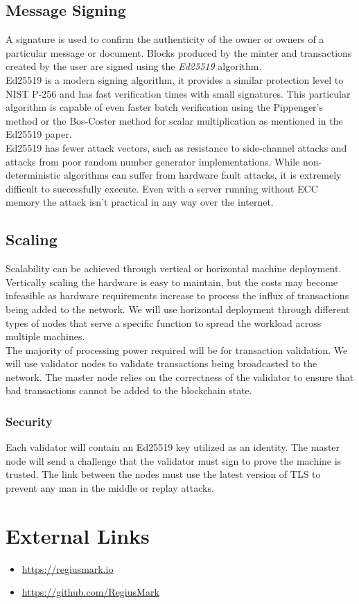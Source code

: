 \documentclass[12pt,a4paper]{article}
\begin{document}
  \subsection{Message Signing}
  A signature is used to confirm the authenticity of the owner or owners of a
  particular message or document. Blocks produced by the minter and transactions
  created by the user are signed using the \textit{Ed25519}\cite{ed25519}
  algorithm.\\

  Ed25519 is a modern signing algorithm, it provides a similar protection level
  to NIST P-256 and has fast verification times with small signatures. This
  particular algorithm is capable of even faster batch verification using the
  Pippenger's method or the Bos-Coster method for scalar multiplication as
  mentioned in the Ed25519 paper.\\

  Ed25519 has fewer attack vectors, such as resistance to side-channel attacks
  and attacks from poor random number generator implementations. While
  non-deterministic algorithms can suffer from hardware fault attacks, it is
  extremely difficult to successfully execute. Even with a server running
  without ECC memory the attack isn't practical in any way over the
  internet.

  \subsection{Scaling}
  Scalability can be achieved through vertical or horizontal machine deployment.
  Vertically scaling the hardware is easy to maintain, but the costs may become
  infeasible as hardware requirements increase to process the influx of
  transactions being added to the network. We will use horizontal deployment
  through different types of nodes that serve a specific function to spread the
  workload across multiple machines.\\

  The majority of processing power required will be for transaction validation.
  We will use validator nodes to validate transactions being broadcasted to the
  network. The master node relies on the correctness of the validator to ensure
  that bad transactions cannot be added to the blockchain state.\\

  \subsubsection{Security}
  Each validator will contain an Ed25519 key utilized as an identity. The master
  node will send a challenge that the validator must sign to prove the machine
  is trusted. The link between the nodes must use the latest version of TLS to
  prevent any man in the middle or replay attacks.

  \newpage
  \section*{External Links}
  \begin{itemize}
    \item{\url{https://regiusmark.io}}
    \item{\url{https://github.com/RegiusMark}}
  \end{itemize}
  \printbibliography{}
\end{document}
